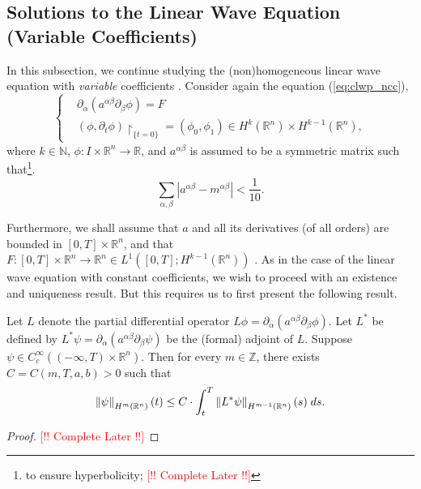 \documentclass{article}
\begin{document}
\subsection{Solutions to the Linear Wave Equation (Variable Coefficients)} \label{subsec:sol_lin_varco}
In this subsection, we continue studying the (non)homogeneous linear wave equation with \textit{variable} coefficients \cite{Luk}. Consider again the equation (\ref{eq:clwp_ncc}), 
\begin{equation*}
	\left\{
	\begin{alignedat}{1}
		&\partial_{\alpha}(a^{\alpha\beta}\partial_{\beta}\phi) = F \\
		&(\phi, \partial_{t}\phi)\upharpoonright_{\{t = 0\}} = (\phi_{0}, \phi_{1}) \in H^{k}(\mathbb{R}^{n}) \times H^{k - 1}(\mathbb{R}^{n}), 
	\end{alignedat}
	\right.
\end{equation*}
where $k \in \mathbb{N}$, $\phi: I \times \mathbb{R}^{n} \to \mathbb{R}$, and $a^{\alpha\beta}$ is assumed to be a symmetric matrix such that\footnote{to ensure hyperbolicity; \textcolor{red}{[!! Complete Later !!]}}. 
\begin{equation*}
	\sum_{\alpha,\beta}|a^{\alpha\beta} - m^{\alpha\beta}| < \frac{1}{10}. 
\end{equation*}

Furthermore, we shall assume that $a$ and all its derivatives (of all orders) are bounded in $[0,T] \times \mathbb{R}^{n}$, and that $F: [0,T] \times \mathbb{R}^{n} \to \mathbb{R}^{n} \in L^{1}([0,T];H^{k-1}(\mathbb{R}^{n}))$ . As in the case of the linear wave equation with constant coefficients, we wish to proceed with an existence and uniqueness result. But this requires us to first present the following result. 

\begin{lemma}
	Let $L$ denote the partial differential operator $L\phi = \partial_{\alpha}(a^{\alpha\beta}\partial_{\beta}\phi)$. Let $L^{\ast}$ be defined by $L^{\ast}\psi = \partial_{\alpha}(a^{\alpha\beta}\partial_{\beta}\psi)$ be the (formal) adjoint of $L$. Suppose $\psi \in C_{c}^{\infty}((-\infty, T) \times \mathbb{R}^{n})$. Then for every $m \in \mathbb{Z}$, there exists $C = C(m, T, a, b) > 0$ such that 
	\begin{equation}
		\left\Vert \psi \right\Vert_{H^{m}(\mathbb{R}^{n})}(t) \leq C \cdot \int_{t}^{T}\left\Vert L^{\ast}\psi \right\Vert_{H^{m-1}(\mathbb{R}^{n})}(s)\;ds. 
		\label{eq:sobNorm_ncc}
	\end{equation}  
\end{lemma} 
\begin{proof}
	\textcolor{red}{[!! Complete Later !!]}
\end{proof}
\end{document}
